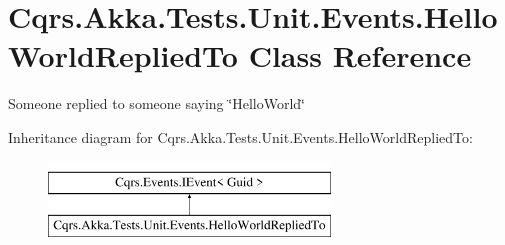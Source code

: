 \hypertarget{classCqrs_1_1Akka_1_1Tests_1_1Unit_1_1Events_1_1HelloWorldRepliedTo}{}\section{Cqrs.\+Akka.\+Tests.\+Unit.\+Events.\+Hello\+World\+Replied\+To Class Reference}
\label{classCqrs_1_1Akka_1_1Tests_1_1Unit_1_1Events_1_1HelloWorldRepliedTo}


Someone replied to someone saying \char`\"{}\+Hello\+World\char`\"{}  


Inheritance diagram for Cqrs.\+Akka.\+Tests.\+Unit.\+Events.\+Hello\+World\+Replied\+To\+:\begin{figure}[H]
\begin{center}
\leavevmode
\includegraphics[height=2.000000cm]{classCqrs_1_1Akka_1_1Tests_1_1Unit_1_1Events_1_1HelloWorldRepliedTo}
\end{center}
\end{figure}
